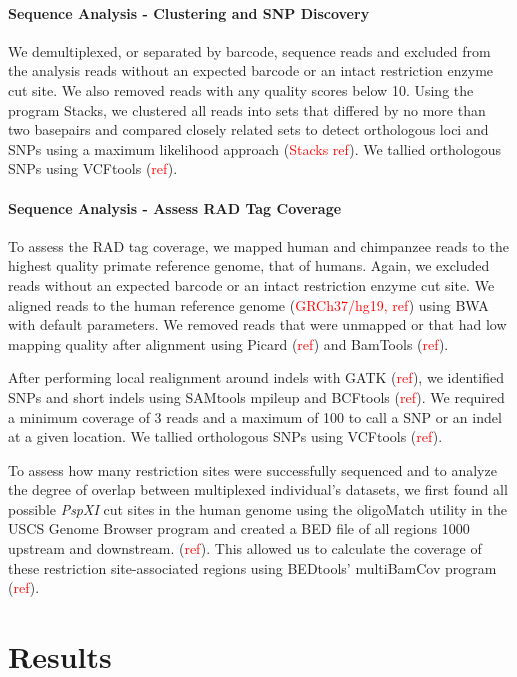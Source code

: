 \documentclass[12pt]{article}
\begin{document}
\paragraph{Sequence Analysis - Clustering and SNP Discovery}

We demultiplexed, or separated by barcode, sequence reads and excluded from the analysis reads without an expected barcode or an intact restriction enzyme cut site. We also removed reads with any quality scores below 10. Using the program Stacks, we clustered all reads into sets that differed by no more than two basepairs and compared closely related sets to detect orthologous loci and SNPs using a maximum likelihood approach (\textcolor{red}{Stacks ref}). We tallied orthologous SNPs using VCFtools (\textcolor{red}{ref}).

\paragraph{Sequence Analysis - Assess RAD Tag Coverage}

To assess the RAD tag coverage, we mapped human and chimpanzee reads to the highest quality primate reference genome, that of humans. Again, we excluded reads without an expected barcode or an intact restriction enzyme cut site. We aligned reads to the human reference genome (\textcolor{red}{GRCh37/hg19, ref}) using BWA with default parameters. We removed reads that were unmapped or that had low mapping quality after alignment using Picard (\textcolor{red}{ref}) and BamTools (\textcolor{red}{ref}). 

After performing local realignment around indels with GATK (\textcolor{red}{ref}), we identified SNPs and short indels using SAMtools mpileup and BCFtools (\textcolor{red}{ref}). We required a minimum coverage of 3 reads and a maximum of 100 to call a SNP or an indel at a given location. We tallied orthologous SNPs using VCFtools (\textcolor{red}{ref}).
	
To assess how many restriction sites were successfully sequenced and to analyze the degree of overlap between multiplexed individual's datasets, we first found all possible \emph{PspXI} cut sites in the human genome using the oligoMatch utility in the USCS Genome Browser program and created a BED file of all regions 1000 upstream and downstream. (\textcolor{red}{ref}). This allowed us to calculate the coverage of these restriction site-associated regions using BEDtools' multiBamCov program (\textcolor{red}{ref}).

\section{Results}
\end{document}
